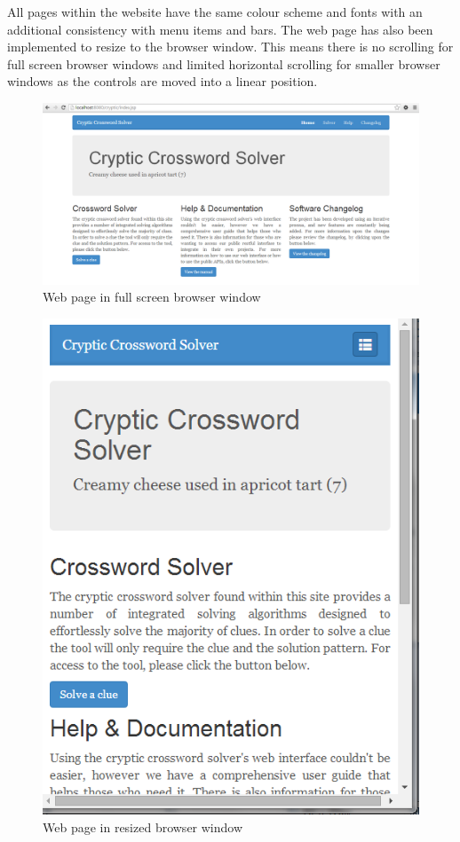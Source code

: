 All pages within the website have the same colour scheme and fonts  with an
additional consistency with menu items and bars. The web page  has also been
implemented to resize to the browser window. This means  there is no scrolling
for full screen browser windows and limited horizontal  scrolling for smaller
browser windows as the controls are moved into a linear  position.

\begin{figure}[H]
	\centering
	\includegraphics[scale=0.4]{evidence/scrolling.png}
	\caption{Web page in full screen browser window}
\end{figure}

\begin{figure}[H]
	\centering
	\includegraphics[scale=0.6]{evidence/scrolling1.png}
	\caption{Web page in resized browser window}
\end{figure}

